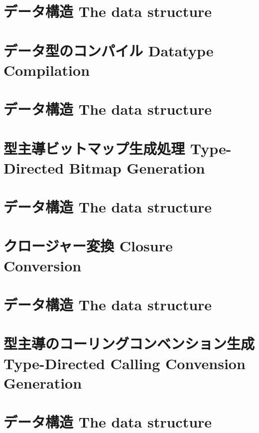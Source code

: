 \chapter{\txt
{データ構造}
{The  data structure}
}
\label{chap:TypedLambda}

\chapter{\txt
{データ型のコンパイル}
{Datatype Compilation}
}
\label{chap:datatypecompilation}

\chapter{\txt
{データ構造}
{The  data structure}
}
\label{chap:BitmapCalc}

\chapter{\txt
{型主導ビットマップ生成処理}
{Type-Directed Bitmap Generation}
}
\label{chap:bitmapgeneration}

\chapter{\txt
{データ構造}
{The  data structure}
}
\label{chap:ClosureCalc}

\chapter{\txt
{クロージャー変換}
{Closure Conversion}
}
\label{chap:closureconversion}

\chapter{\txt
{データ構造}
{The  data structure}
}
\label{chap:RuntimeCalc}

\chapter{\txt
{型主導のコーリングコンベンション生成}
{Type-Directed Calling Convension Generation}
}
\label{chap:callingconventiongeneration}

\chapter{\txt
{データ構造}
{The  data structure}
}
\label{chap:ANormal}

